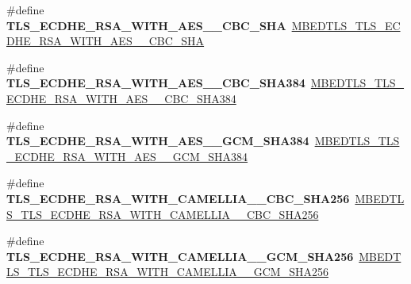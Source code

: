 \begin{DoxyCompactItemize}
\mbox{\label{compat-1_83_8h_a9889f63e65374add6ecf1b0243c381f4}} 
\#define {\bfseries T\+L\+S\+\_\+\+E\+C\+D\+H\+E\+\_\+\+R\+S\+A\+\_\+\+W\+I\+T\+H\+\_\+\+A\+E\+S\+\_\+\_\+\+C\+B\+C\+\_\+\+S\+HA}~\mbox{\hyperlink{ssl__ciphersuites_8h_ad345b02fd7b519c4980fcbb5a7cabc88}{M\+B\+E\+D\+T\+L\+S\+\_\+\+T\+L\+S\+\_\+\+E\+C\+D\+H\+E\+\_\+\+R\+S\+A\+\_\+\+W\+I\+T\+H\+\_\+\+A\+E\+S\+\_\+\_\+\+C\+B\+C\+\_\+\+S\+HA}}
\item 
\mbox{\label{compat-1_83_8h_ab25ddd336d25df6621b1436be12450eb}} 
\#define {\bfseries T\+L\+S\+\_\+\+E\+C\+D\+H\+E\+\_\+\+R\+S\+A\+\_\+\+W\+I\+T\+H\+\_\+\+A\+E\+S\+\_\+\_\+\+C\+B\+C\+\_\+\+S\+H\+A384}~\mbox{\hyperlink{ssl__ciphersuites_8h_aed277b98a024d972ffcbb8a41443ed8c}{M\+B\+E\+D\+T\+L\+S\+\_\+\+T\+L\+S\+\_\+\+E\+C\+D\+H\+E\+\_\+\+R\+S\+A\+\_\+\+W\+I\+T\+H\+\_\+\+A\+E\+S\+\_\+\_\+\+C\+B\+C\+\_\+\+S\+H\+A384}}
\item 
\mbox{\label{compat-1_83_8h_a5d287e13f2484dd37398fa342fdef7b4}} 
\#define {\bfseries T\+L\+S\+\_\+\+E\+C\+D\+H\+E\+\_\+\+R\+S\+A\+\_\+\+W\+I\+T\+H\+\_\+\+A\+E\+S\+\_\+\_\+\+G\+C\+M\+\_\+\+S\+H\+A384}~\mbox{\hyperlink{ssl__ciphersuites_8h_accc1a6f82abe98ed5b9377c9013514ce}{M\+B\+E\+D\+T\+L\+S\+\_\+\+T\+L\+S\+\_\+\+E\+C\+D\+H\+E\+\_\+\+R\+S\+A\+\_\+\+W\+I\+T\+H\+\_\+\+A\+E\+S\+\_\+\_\+\+G\+C\+M\+\_\+\+S\+H\+A384}}
\item 
\mbox{\label{compat-1_83_8h_afae694ab832d209474875d2a55a5e202}} 
\#define {\bfseries T\+L\+S\+\_\+\+E\+C\+D\+H\+E\+\_\+\+R\+S\+A\+\_\+\+W\+I\+T\+H\+\_\+\+C\+A\+M\+E\+L\+L\+I\+A\+\_\+\_\+\+C\+B\+C\+\_\+\+S\+H\+A256}~\mbox{\hyperlink{ssl__ciphersuites_8h_a17aafd00b4755df5d3358962ae77ce06}{M\+B\+E\+D\+T\+L\+S\+\_\+\+T\+L\+S\+\_\+\+E\+C\+D\+H\+E\+\_\+\+R\+S\+A\+\_\+\+W\+I\+T\+H\+\_\+\+C\+A\+M\+E\+L\+L\+I\+A\+\_\+\_\+\+C\+B\+C\+\_\+\+S\+H\+A256}}
\item 
\mbox{\label{compat-1_83_8h_adbfcbf815464735c11cf38ae2a006ab7}} 
\#define {\bfseries T\+L\+S\+\_\+\+E\+C\+D\+H\+E\+\_\+\+R\+S\+A\+\_\+\+W\+I\+T\+H\+\_\+\+C\+A\+M\+E\+L\+L\+I\+A\+\_\+\_\+\+G\+C\+M\+\_\+\+S\+H\+A256}~\mbox{\hyperlink{ssl__ciphersuites_8h_a1cef8735e16a7d976c676ae4a66ef2d6}{M\+B\+E\+D\+T\+L\+S\+\_\+\+T\+L\+S\+\_\+\+E\+C\+D\+H\+E\+\_\+\+R\+S\+A\+\_\+\+W\+I\+T\+H\+\_\+\+C\+A\+M\+E\+L\+L\+I\+A\+\_\+\_\+\+G\+C\+M\+\_\+\+S\+H\+A256}}

\end{DoxyCompactItemize}
